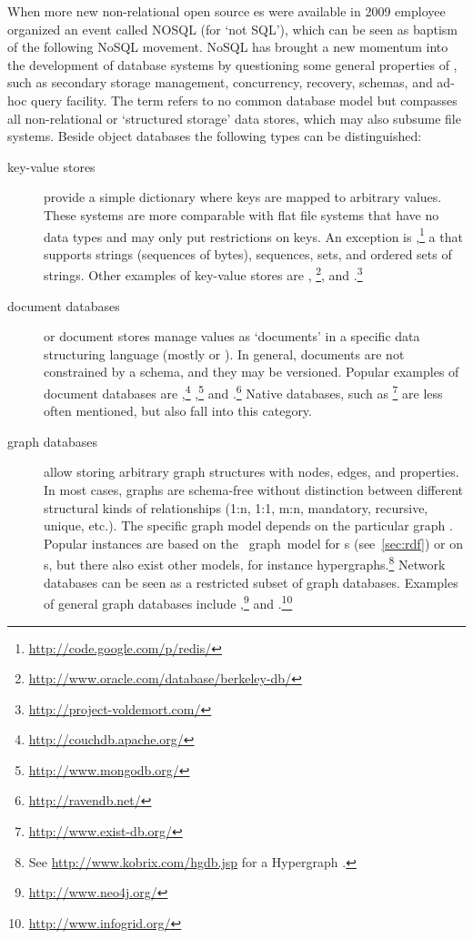 When more new non-relational open source es 
were available in 2009  employee 
organized an event called NOSQL (for `not SQL'), which can be seen as baptism of
the following NoSQL movement. NoSQL has brought a new momentum into the development
of database systems by questioning some general properties of ,
such as secondary storage management, concurrency, recovery, schemas, and ad-hoc
query facility. The term refers to no common database model but compasses all
non-relational or `structured storage' data stores, which may also subsume file
systems. Beside object databases the following types can be distinguished:

\begin{description}

\item[key-value stores] provide a simple dictionary where keys are mapped
to arbitrary values. These systems are more comparable with flat file
systems that have no data types and may only put restrictions on keys.
An exception is ,\footnote{\url{http://code.google.com/p/redis/}}
a  that supports strings (sequences of bytes), sequences,
sets, and ordered sets of strings. Other examples of key-value stores are 
 \cite{S3DevGuide}, 
\footnote{\url{http://www.oracle.com/database/berkeley-db/}},
and .\footnote{\url{http://project-voldemort.com/}}

\item[document databases] or document stores manage values as `documents' in a
specific data structuring language (mostly  or ). In
general, documents are not constrained by a schema, and they may be versioned.
Popular examples of document databases are
,\footnote{\url{http://couchdb.apache.org/}}
,\footnote{\url{http://www.mongodb.org/}} and
.\footnote{\url{http://ravendb.net/}} Native
 databases, such as
\footnote{\url{http://www.exist-db.org/}} are less 
often mentioned, but also fall into this category.

\item[graph databases] allow storing arbitrary graph structures with
nodes, edges, and properties. In most cases, graphs are schema-free without
distinction between different structural kinds of relationships (1:n, 1:1, m:n,
mandatory, recursive, unique, etc.). The specific graph model depends on the
particular graph  \cite{Angles2008,Rodriguez2010}. Popular instances
are based on the ~graph~model for s (see~\ref{sec:rdf})
or on s, but there also exist other
models, for instance hypergraphs.\footnote{See
\url{http://www.kobrix.com/hgdb.jsp} for a Hypergraph .} Network
databases can be seen as a restricted subset of graph databases. Examples of
general graph databases include
,\footnote{\url{http://www.neo4j.org/}} and
.\footnote{\url{http://www.infogrid.org/}}


\end{description}
